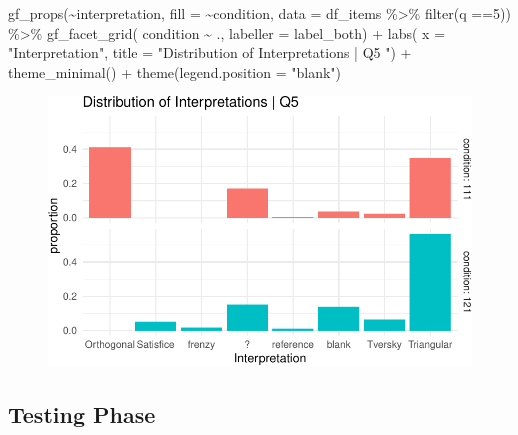 \documentclass[
  letterpaper,
  DIV=11,
  numbers=noendperiod]{scrreprt}
\newenvironment{Shaded}{\begin{snugshade}}{\end{snugshade}}
\newcommand{\AttributeTok}[1]{\textcolor[rgb]{0.40,0.45,0.13}{#1}}
\newcommand{\DecValTok}[1]{\textcolor[rgb]{0.68,0.00,0.00}{#1}}
\newcommand{\FunctionTok}[1]{\textcolor[rgb]{0.28,0.35,0.67}{#1}}
\newcommand{\NormalTok}[1]{\textcolor[rgb]{0.00,0.23,0.31}{#1}}
\newcommand{\SpecialCharTok}[1]{\textcolor[rgb]{0.37,0.37,0.37}{#1}}
\newcommand{\StringTok}[1]{\textcolor[rgb]{0.13,0.47,0.30}{#1}}
\begin{document}
\begin{Shaded}
\begin{Highlighting}[]
\FunctionTok{gf\_props}\NormalTok{(}\SpecialCharTok{\textasciitilde{}}\NormalTok{interpretation, }\AttributeTok{fill =} \SpecialCharTok{\textasciitilde{}}\NormalTok{condition, }\AttributeTok{data =}\NormalTok{ df\_items }\SpecialCharTok{\%\textgreater{}\%} \FunctionTok{filter}\NormalTok{(q }\SpecialCharTok{==}\DecValTok{5}\NormalTok{)) }\SpecialCharTok{\%\textgreater{}\%} 
  \FunctionTok{gf\_facet\_grid}\NormalTok{( condition }\SpecialCharTok{\textasciitilde{}}\NormalTok{ ., }\AttributeTok{labeller =}\NormalTok{ label\_both) }\SpecialCharTok{+} 
  \FunctionTok{labs}\NormalTok{( }\AttributeTok{x =} \StringTok{"Interpretation"}\NormalTok{, }\AttributeTok{title =} \StringTok{"Distribution of Interpretations | Q5 "}\NormalTok{) }\SpecialCharTok{+} 
  \FunctionTok{theme\_minimal}\NormalTok{() }\SpecialCharTok{+} \FunctionTok{theme}\NormalTok{(}\AttributeTok{legend.position =} \StringTok{"blank"}\NormalTok{)}
\end{Highlighting}
\end{Shaded}

\begin{figure}[H]

{\centering \includegraphics{analysis/SGC3A/2_sgc3A_scoring_files/figure-pdf/Q5-distribution-2.pdf}

}

\end{figure}

\hypertarget{testing-phase}{%
\subsection{Testing Phase}\label{testing-phase}}
\end{document}
